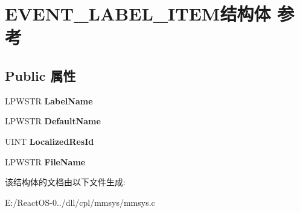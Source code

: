 \hypertarget{struct_e_v_e_n_t___l_a_b_e_l___i_t_e_m}{}\section{E\+V\+E\+N\+T\+\_\+\+L\+A\+B\+E\+L\+\_\+\+I\+T\+E\+M结构体 参考}
\label{struct_e_v_e_n_t___l_a_b_e_l___i_t_e_m}
\subsection*{Public 属性}
\begin{DoxyCompactItemize}
\item 
\mbox{\label{struct_e_v_e_n_t___l_a_b_e_l___i_t_e_m_aaa26eb0b14ead011e315c695c8a0dbcf}} 
L\+P\+W\+S\+TR {\bfseries Label\+Name}
\item 
\mbox{\label{struct_e_v_e_n_t___l_a_b_e_l___i_t_e_m_a9449012afa59c8a7d4d7b5ccb0fff61c}} 
L\+P\+W\+S\+TR {\bfseries Default\+Name}
\item 
\mbox{\label{struct_e_v_e_n_t___l_a_b_e_l___i_t_e_m_a1613c24dafcd2fa01019192a3468af39}} 
U\+I\+NT {\bfseries Localized\+Res\+Id}
\item 
\mbox{\label{struct_e_v_e_n_t___l_a_b_e_l___i_t_e_m_afe8ec5fdfced789afe0e2410b81982b8}} 
L\+P\+W\+S\+TR {\bfseries File\+Name}
\end{DoxyCompactItemize}


该结构体的文档由以下文件生成\+:\begin{DoxyCompactItemize}
\item 
E\+:/\+React\+O\+S-\/0../dll/cpl/mmsys/mmsys.\+c\end{DoxyCompactItemize}
